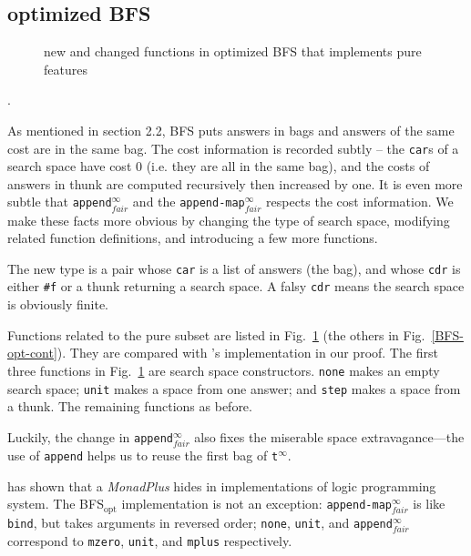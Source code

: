 \documentclass[format=acmlarge, review=true, authordraft=true]{acmart}
\newcommand{\BFSopt}[0]{BFS$_\textrm{opt}$}
\begin{document}
\subsection{optimized BFS}

\begin{figure}
		
	\caption{new and changed functions in optimized BFS that implements pure 
	features}
	\label{BFS-opt}
\end{figure}

.

As mentioned in section 2.2, BFS puts answers in bags and answers of the 
same cost are in the same bag. The cost
information is recorded subtly -- the \texttt{car}s of a search space have cost 
0 (i.e. they are all in the same bag), and the costs of answers in thunk are 
computed recursively then increased by one. It is even more subtle that
\texttt{append$^\infty_{fair}$} and the \texttt{append-map$^\infty_{fair}$} 
respects the cost information. We make these facts more obvious by 
changing the type of search space, modifying related function definitions, 
and introducing a few more functions.

The new type is a pair whose \texttt{car} is a list of answers (the bag), and 
whose \texttt{cdr} is either \texttt{\#{}f} or a thunk returning a search 
space. A falsy \texttt{cdr} means the search space is obviously finite. 

Functions related to the pure subset are listed in Fig.~\ref{BFS-opt} (the 
others in Fig.~\ref{BFS-opt-cont}). They are compared with 
\citeauthor{seres1999algebra}'s implementation in our proof. The first three 
functions in Fig.~\ref{BFS-opt} are search space constructors. \texttt{none} 
makes an empty search space; \texttt{unit} makes a space from one answer; and 
\texttt{step} makes a space from a thunk. The remaining functions as before.

Luckily, the change in \texttt{append$^\infty_{fair}$} also fixes the miserable 
space 
extravagance---the use of \texttt{append} helps us to reuse the first bag of 
\texttt{t$^\infty$}.

\citet{kiselyov2005backtracking} has shown that a \emph{MonadPlus} hides in 
implementations of logic programming system. The \BFSopt{} implementation is not 
an exception: \texttt{append-map$^\infty_{fair}$} is like \texttt{bind}, 
but takes arguments in reversed order; \texttt{none}, \texttt{unit}, and 
\texttt{append$^\infty_{fair}$} correspond to \texttt{mzero}, \texttt{unit}, 
and \texttt{mplus} respectively.
\end{document}

